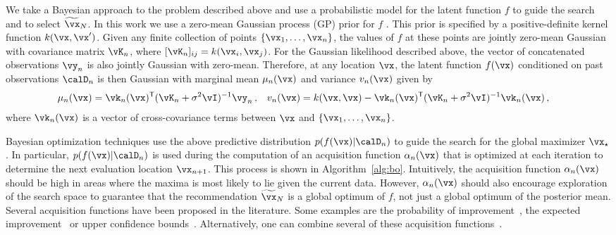 We take a Bayesian approach to the problem described above and use a probabilistic model for the
latent function $f$ to guide the search and to select $\xrec_N$.
In this work we use a zero-mean Gaussian process (GP) prior for $f$
\cite{Rasmussen:2006}. This prior is specified by a positive-definite kernel
function $k(\x,\x')$. Given any finite collection of points
$\{\x_1,\dots,\x_n\}$, the values of $f$ at these points are jointly zero-mean
Gaussian with covariance matrix $\vK_n$, where $[\vK_n]_{ij}=k(\x_i,\x_j)$. For
the Gaussian likelihood described above, the vector of concatenated observations $\vy_n$
is also jointly Gaussian with zero-mean. Therefore, at any
location $\x$, the latent function $f(\x)$ conditioned on past observations
$\D_n$ is then Gaussian with marginal mean $\mu_n(\x)$ and variance $v_n(\x)$
given by
\begin{align}
    \mu_n(\x) 
    &= \vk_n(\x)\T(\vK_n+\sigma^2\vI)^{-1}\vy_n\,, &
    v_n(\x)
    &= k(\x,\x) - \vk_n(\x)\T(\vK_n+\sigma^2\vI)^{-1}\vk_n(\x)\,,
    \label{eq:gpvar}
\end{align}
where $\vk_n(\x)$ is a vector of cross-covariance terms between $\x$ and
$\{\x_1,\dots,\x_n\}$.

Bayesian optimization techniques use the above predictive distribution $p(f(\x)|\D_n)$
to guide the search for the global maximizer $\xopt$. In particular, 
$p(f(\x)|\D_n)$ is used during the computation of an acquisition function $\alpha_n(\x)$
that is optimized at each iteration to determine the next evaluation location $\x_{n+1}$.
This process is shown in Algorithm~\ref{alg:bo}. Intuitively, the acquisition function
$\alpha_n(\x)$ should be high in areas where the maxima is most likely to lie given the current data.
However, $\alpha_n(\x)$ should also encourage exploration of the search space to
guarantee that the recommendation $\xrec_N$ is a global optimum of $f$, not just a global
optimum of the posterior mean.  Several acquisition functions have been proposed
in the literature. Some examples are the probability of
improvement~\citep{Kushner:1964}, the expected improvement~\citep{Mockus:1978}
or upper confidence bounds~\citep{Srinivas:2010}.  Alternatively, one can
combine several of these acquisition functions~\citep{Hoffman:2011}.

